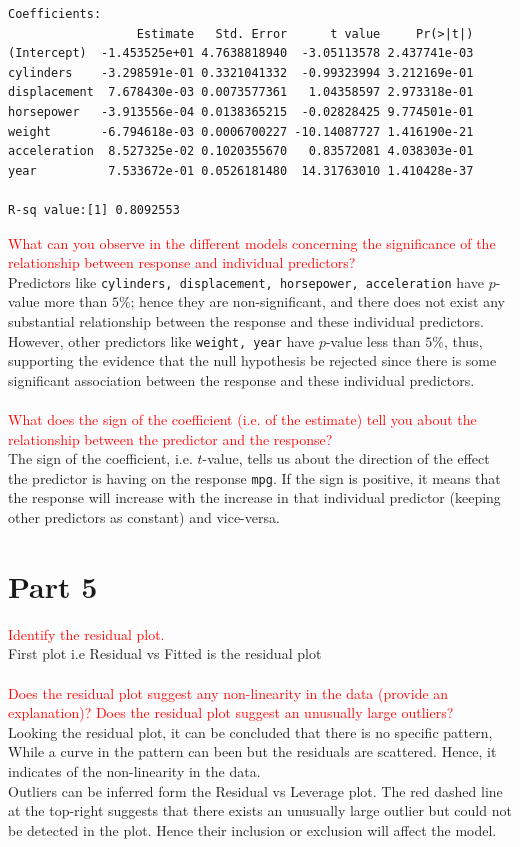 \documentclass{article}[a4paper]
\begin{document}
\begin{lstlisting}
Coefficients:
                  Estimate   Std. Error      t value     Pr(>|t|)
(Intercept)  -1.453525e+01 4.7638818940  -3.05113578 2.437741e-03
cylinders    -3.298591e-01 0.3321041332  -0.99323994 3.212169e-01
displacement  7.678430e-03 0.0073577361   1.04358597 2.973318e-01
horsepower   -3.913556e-04 0.0138365215  -0.02828425 9.774501e-01
weight       -6.794618e-03 0.0006700227 -10.14087727 1.416190e-21
acceleration  8.527325e-02 0.1020355670   0.83572081 4.038303e-01
year          7.533672e-01 0.0526181480  14.31763010 1.410428e-37

R-sq value:[1] 0.8092553
\end{lstlisting}

\textcolor{red}{What can you observe in the different models concerning the significance of the relationship between response and individual predictors?}\\
Predictors like \texttt{cylinders, displacement, horsepower, acceleration} have $p$-value more than $5\%$; hence they are non-significant, and there does not exist any substantial relationship between the response and these individual predictors. However, other predictors like \texttt{weight, year} have $p$-value less than $5\%$, thus, supporting the evidence that the null hypothesis be rejected since there is some significant association between the response and these individual predictors.
\\~\\
\textcolor{red}{What does the sign of the coefficient (i.e. of the estimate) tell you about the relationship between the predictor and the response?}\\
The sign of the coefficient, i.e. $t$-value, tells us about the direction of the effect the predictor is having on the response \texttt{mpg}. If the sign is positive, it means that the response will increase with the increase in that individual predictor (keeping other predictors as constant) and vice-versa.


\section*{Part 5}
\textcolor{red}{Identify the residual plot.}\\
First plot i.e Residual vs Fitted is the residual plot
\\~\\
\textcolor{red}{Does the residual plot suggest any non-linearity in the data (provide an explanation)? Does the residual plot suggest an unusually large outliers?}\\
Looking the residual plot, it can be concluded that there is no specific pattern, While a curve in the pattern can been but the residuals are scattered. Hence, it indicates of the non-linearity in the data.\\
Outliers can be inferred form the  Residual vs Leverage plot. The red dashed line at the top-right suggests that there exists an unusually large outlier but could not be detected in the plot. Hence their inclusion or exclusion will affect the model.
\end{document}
